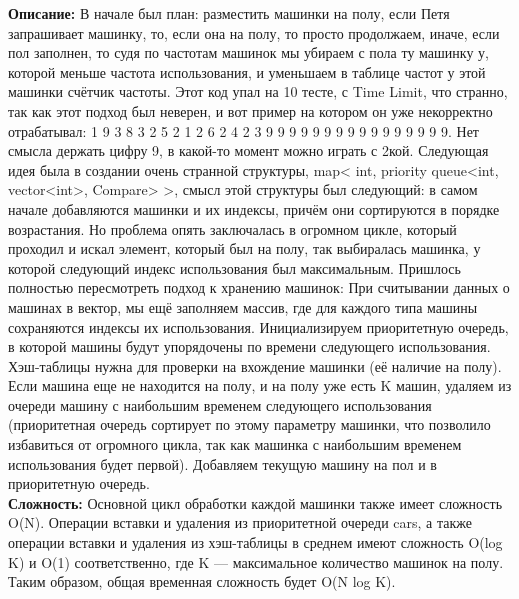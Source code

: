 \documentclass{article}
\newcommand{\descr}[2]{%
    \textbf{Описание: } #1\\
    \textbf{Сложность: } #2
}
\begin{document}
\descr{В начале был план: разместить машинки на полу, если Петя запрашивает машинку, то, если она на полу, то просто продолжаем, иначе, если пол заполнен, то судя по частотам машинок мы убираем с пола ту машинку у, которой меньше частота использования, и уменьшаем в таблице частот у этой машинки счётчик частоты. Этот код упал на 10 тесте, с Time Limit, что странно, так как этот подход был неверен, и вот пример на котором он уже некорректно отрабатывал: 1 9 3 8 3 2 5 2 1 2 6 2 4 2 3 9 9 9 9 9 9 9 9 9 9 9 9 9 9 9 9. Нет смысла держать цифру 9, в какой-то момент можно играть с 2кой.
Следующая идея была в создании очень странной структуры, map< int, priority queue<int, vector<int>, Compare> >, смысл этой структуры был следующий: в самом начале добавляются машинки и их индексы, причём они сортируются в порядке возрастания. Но проблема опять заключалась в огромном цикле, который проходил и искал элемент, который был на полу, так выбиралась машинка, у которой следующий индекс использования был максимальным. 
Пришлось полностью пересмотреть подход к хранению машинок: При считывании данных о машинах в вектор, мы ещё заполняем массив, где для каждого типа машины сохраняются индексы их использования. Инициализируем приоритетную очередь, в которой машины будут упорядочены по времени следующего использования. Хэш-таблицы нужна для проверки на вхождение машинки (её наличие на полу).  Если машина еще не находится на полу, и на полу уже есть K машин, удаляем из очереди машину с наибольшим временем следующего использования (приоритетная очередь сортирует по этому параметру машинки, что позволило избавиться от огромного цикла, так как машинка с наибольшим временем использования будет первой). Добавляем текущую машину на пол и в приоритетную очередь. 
}{
    Основной цикл обработки каждой машинки также имеет сложность O(N). Операции вставки и удаления из приоритетной очереди cars, а также операции вставки и удаления из хэш-таблицы в среднем имеют сложность O(log K) и O(1) соответственно, где K — максимальное количество машинок на полу. Таким образом, общая временная сложность будет O(N log K).
}\\
\end{document}
